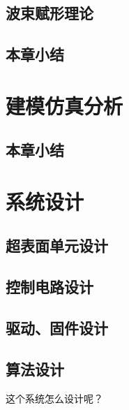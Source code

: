 \documentclass[supercite]{HustGraduPaper}
\begin{document}
\subsection{波束赋形理论}

\subsection{本章小结}

\section{建模仿真分析}\label{sec:simulation}

\subsection{本章小结}

\section{系统设计}\label{sec:design}

\subsection{超表面单元设计}

\subsection{控制电路设计}

\subsection{驱动、固件设计}

\subsection{算法设计}

这个系统怎么设计呢？
\end{document}
